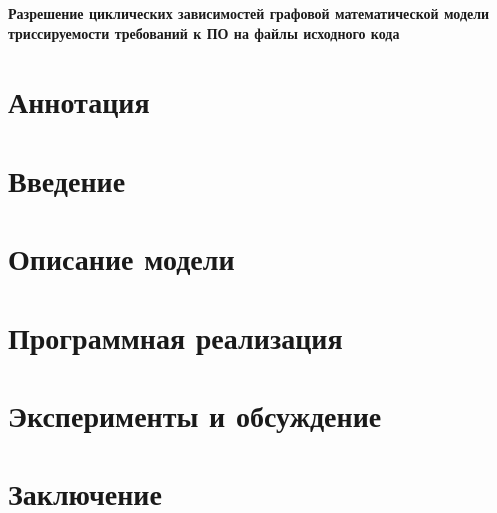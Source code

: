 \documentclass{article}
\begin{document}
    \begin{center}
    \large
    \textbf{Разрешение циклических зависимостей графовой математической модели триссируемости требований к ПО на файлы исходного кода}



    \end{center}

    \tableofcontents
    \newpage

    \section{Аннотация}
    

    \section{Введение}
    

    \section{Описание модели}
    

    \section{Программная реализация}
    

    \section{Эксперименты и обсуждение}
    

    \section{Заключение}
    
\end{document}
